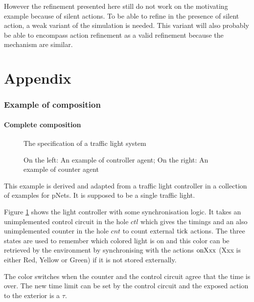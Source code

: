 \documentclass{article}
\begin{document}

However the refinement presented here still do not work on the motivating example because of silent actions.
To be able to refine in the presence of silent action, a weak variant of the simulation is needed.
This variant will also probably be able to encompass action refinement as a valid refinement because the mechanism are similar.


\pagebreak



\pagebreak
\appendix
\part*{Appendix}

\section{Example of composition}

\subsection{Complete composition}\label{apx:composition}
\begin{figure}[h]
\centering

\caption{The specification of a traffic light system}
\label{fig:tls}
\end{figure}
\begin{figure}
\centering

\vrule

\caption{On the left: An example of controller agent; On the right: An example of counter agent}
\label{fig:tlh}
\end{figure}
This example is derived and adapted from a traffic light controller in a collection of examples for pNets.
It is supposed to be a single traffic light.

Figure \ref{fig:tls} shows the light controller with some synchronisation logic.
It takes an unimplemented control circuit in the hole \(ctl\) which gives the timings and an also unimplemented counter in the hole \(cnt\) to count external \(\mathrm{tick}\) actions.
The three states are used to remember which colored light is on and this color can be retrieved by the environment by synchronising with the actions \(\mathrm{onXxx}\) (Xxx is either Red, Yellow or Green) if it is not stored externally.

The color switches when the counter and the control circuit agree that the time is over.
The new time limit can be set by the control circuit and the exposed action to the exterior is a \(\tau\).
\end{document}
